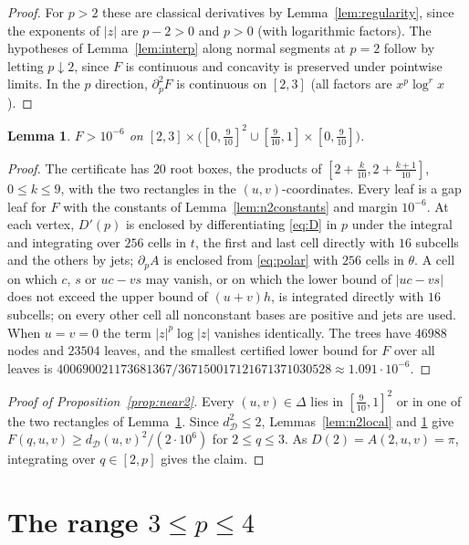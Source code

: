 \documentclass[11pt]{amsart}
\newtheorem{lemma}[theorem]{Lemma}
\theoremstyle{definition}
\theoremstyle{remark}
\numberwithin{equation}{section}
\newcommand{\cD}{\mathcal{D}}
\begin{document}
\begin{proof}
For $p>2$ these are classical derivatives by Lemma~\ref{lem:regularity}, since the exponents of $|z|$ are $p-2>0$ and $p>0$ (with logarithmic factors). The hypotheses of Lemma~\ref{lem:interp} along normal segments at $p=2$ follow by letting $p\downarrow2$, since $F$ is continuous and concavity is preserved under pointwise limits. In the $p$ direction, $\partial_p^2F$ is continuous on $[2,3]$ (all factors are $x^p\log^rx$).
\end{proof}

\begin{lemma}\label{lem:n2compl}
$F>10^{-6}$ on $[2,3]\times\bigl([0,\frac9{10}]^2\cup[\frac9{10},1]\times[0,\frac9{10}]\bigr)$.
\end{lemma}

\begin{proof}
The certificate has $20$ root boxes, the products of $[2+\frac k{10},2+\frac{k+1}{10}]$, $0\le k\le9$, with the two rectangles in the $(u,v)$-coordinates. Every leaf is a gap leaf for $F$ with the constants of Lemma~\ref{lem:n2constants} and margin $10^{-6}$. At each vertex, $D'(p)$ is enclosed by differentiating \eqref{eq:D} in $p$ under the integral and integrating over $256$ cells in $t$, the first and last cell directly with $16$ subcells and the others by jets; $\partial_pA$ is enclosed from \eqref{eq:polar} with $256$ cells in $\theta$. A cell on which $c$, $s$ or $uc-vs$ may vanish, or on which the lower bound of $|uc-vs|$ does not exceed the upper bound of $(u+v)h$, is integrated directly with $16$ subcells; on every other cell all nonconstant bases are positive and jets are used. When $u=v=0$ the term $|z|^p\log|z|$ vanishes identically. The trees have $46988$ nodes and $23504$ leaves, and the smallest certified lower bound for $F$ over all leaves is $400690021173681367/367150017121671371030528\approx1.091\cdot10^{-6}$.
\end{proof}

\begin{proof}[Proof of Proposition~\ref{prop:near2}]
Every $(u,v)\in\Delta$ lies in $[\frac9{10},1]^2$ or in one of the two rectangles of Lemma~\ref{lem:n2compl}. Since $d_\cD^2\le2$, Lemmas~\ref{lem:n2local} and \ref{lem:n2compl} give $F(q,u,v)\ge d_\cD(u,v)^2/(2\cdot10^6)$ for $2\le q\le3$. As $D(2)=A(2,u,v)=\pi$, integrating over $q\in[2,p]$ gives the claim.
\end{proof}

\section{The range \texorpdfstring{$3\le p\le4$}{3<=p<=4}}\label{sec:34}
\end{document}
